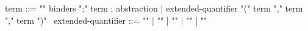 \begin{syntax}
term ::= "\lambda" binders ";" term ; abstraction
| extended-quantifier "(" term "," term "," term ")"
\
extended-quantifier ::= "\max" | "\min" | "\sum" | "\product"
                      | "\numof"
\end{syntax}